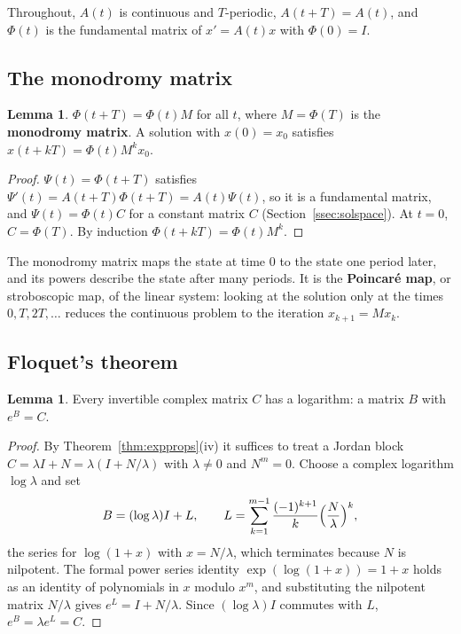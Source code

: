 \documentclass[11pt,a4paper]{article}
\numberwithin{equation}{section}
\theoremstyle{definition}
\newtheorem{lem}[thm]{Lemma}
\begin{document}
Throughout, $A(t)$ is continuous and $T$-periodic, $A(t + T) = A(t)$, and $\Phi(t)$ is the fundamental matrix of $x' = A(t)x$ with $\Phi(0) = I$.

\subsection{The monodromy matrix}
\label{ssec:monodromy}

\begin{lem}
\label{lem:monodromy}
$\Phi(t + T) = \Phi(t)M$ for all $t$, where $M = \Phi(T)$ is the \textbf{monodromy matrix}. A solution with $x(0) = x_0$ satisfies $x(t + kT) = \Phi(t)M^kx_0$.
\end{lem}

\begin{proof}
$\Psi(t) = \Phi(t + T)$ satisfies $\Psi'(t) = A(t + T)\Phi(t + T) = A(t)\Psi(t)$, so it is a fundamental matrix, and $\Psi(t) = \Phi(t)C$ for a constant matrix $C$ (Section~\ref{ssec:solspace}). At $t = 0$, $C = \Phi(T)$.
By induction $\Phi(t + kT) = \Phi(t)M^k$.
\end{proof}

The monodromy matrix maps the state at time $0$ to the state one period later, and its powers describe the state after many periods. It is the \textbf{Poincar\'e map}, or
stroboscopic map, of the linear system: looking at the solution only at the times $0, T, 2T, \dots$ reduces the continuous problem to the iteration $x_{k+1} = Mx_k$.

\subsection{Floquet's theorem}
\label{ssec:floquetthm}

\begin{lem}
\label{lem:matlog}
Every invertible complex matrix $C$ has a logarithm: a matrix $B$ with $e^B = C$.
\end{lem}

\begin{proof}
By Theorem~\ref{thm:expprops}(iv) it suffices to treat a Jordan block $C = \lambda I + N = \lambda(I + N/\lambda)$ with $\lambda \neq 0$ and $N^m = 0$. Choose a complex logarithm $\log\lambda$ and set
\[
B = (\log\lambda)I + L, \qquad L = \sum_{k=1}^{m-1}\frac{(-1)^{k+1}}{k}\Bigl(\frac N\lambda\Bigr)^k ,
\]
the series for $\log(1 + x)$ with $x = N/\lambda$, which terminates because $N$ is nilpotent. The formal power series identity $\exp(\log(1 + x)) = 1 + x$ holds as an identity of polynomials in $x$
modulo $x^m$, and substituting the nilpotent matrix $N/\lambda$ gives $e^L = I + N/\lambda$. Since $(\log\lambda)I$ commutes with $L$, $e^B = \lambda e^L = C$.
\end{proof}
\end{document}
